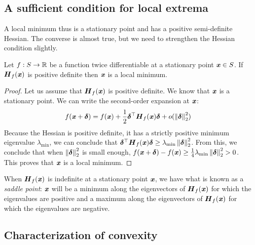 \subsection{A sufficient condition for local extrema}
A local minimum thus is a stationary point and has a positive
semi-definite Hessian.
The converse is almost true, but we need to strengthen the
Hessian condition slightly.

\begin{theorem}
Let $f:S \rightarrow\mathbb{R}$ be a function twice differentiable at
    a stationary point $\boldsymbol{\mathit{x}}\in S$.
     If $\boldsymbol{{H}}_f(\boldsymbol{\mathit{x}})$ is positive definite then $\boldsymbol{\mathit{x}}$ is a local minimum.
\end{theorem}

\begin{proof}
    Let us assume that $\boldsymbol{{H}}_f(\boldsymbol{\mathit{x}})$ is positive definite. We know that $\boldsymbol{\mathit{x}}$ is a stationary point. We can write the second-order expansion at $\boldsymbol{\mathit{x}}$:
    \begin{displaymath}
        f(\boldsymbol{\mathit{x}} +\boldsymbol{\delta}) = f(\boldsymbol{\mathit{x}}) + \frac{1}{2} \boldsymbol{\delta}^\top
        \boldsymbol{{H}}_f(\boldsymbol{\mathit{x}}) \boldsymbol{\delta} + o( \left\| \boldsymbol{\delta} \right\|_2^2)
      \end{displaymath}
    Because the Hessian is positive definite, it has a strictly
    positive minimum eigenvalue $\lambda_{\min}$, we can conclude that
    $\boldsymbol{\delta}^\top \boldsymbol{{H}}_f(\boldsymbol{\mathit{x}}) \boldsymbol{\delta} \geq \lambda_{\min} \left\| \boldsymbol{\delta} \right\|_2^2$.
    From this, we conclude that when $\left\| \boldsymbol{\delta} \right\|_2^2$ is small
    enough,
    $f(\boldsymbol{\mathit{x}}+\boldsymbol{\delta})-f(\boldsymbol{\mathit{x}}) \geq \frac{1}{4} \lambda_{\min}
    \left\| \boldsymbol{\delta} \right\|_2^2 > 0$.
   This proves that $\boldsymbol{\mathit{x}}$ is a local minimum.
\end{proof}

\begin{remark}
    When $\boldsymbol{{H}}_f(\boldsymbol{\mathit{x}})$ is indefinite at a stationary point $\boldsymbol{\mathit{x}}$, we have what is known as a \emph{saddle point}: $\boldsymbol{\mathit{x}}$ will be a minimum along the eigenvectors of $\boldsymbol{{H}}_f(\boldsymbol{\mathit{x}})$ for which the eigenvalues are positive and a maximum along the eigenvectors of $\boldsymbol{{H}}_f(\boldsymbol{\mathit{x}})$ for which the eigenvalues are negative.
  \end{remark}

\subsection{Characterization of convexity}

